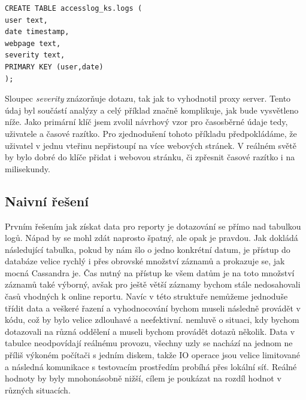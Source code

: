 \documentclass[thesis=M,czech]{FITthesis}[2012/06/26]
\begin{document}
\begin{lstlisting}[caption={Návrh tabulky pro ukládání všech logů},label=LogTable]
CREATE TABLE accesslog_ks.logs ( 
user text,
date timestamp,
webpage text,
severity text,
PRIMARY KEY (user,date) 
);
\end{lstlisting}

Sloupec \emph{severity} znázorňuje  dotazu, tak jak to vyhodnotil proxy server. Tento údaj byl součástí analýzy a celý příklad značně komplikuje, jak bude vysvětleno níže. Jako primární klíč jsem zvolil návrhový vzor pro časosběrné údaje tedy, uživatele a časové razítko. Pro zjednodušení tohoto příkladu předpokládáme, že uživatel v jednu vteřinu nepřistoupí na více webových stránek. V reálném světě by bylo dobré do klíče přidat i webovou stránku, či zpřesnit časové razítko i na milisekundy. 

\subsection{Naivní řešení}
Prvním řešením jak získat data pro reporty je dotazování se přímo nad tabulkou logů. Nápad by se mohl zdát naprosto špatný, ale opak je pravdou. Jak dokládá následující tabulka, pokud by nám šlo o jedno konkrétní datum, je přístup do databáze velice rychlý i přes obrovské množství záznamů a prokazuje se, jak mocná Cassandra je. Čas nutný na přístup ke všem datům je na toto množství záznamů také výborný, avšak pro ještě větší záznamy bychom stále nedosahovali časů vhodných k online reportu. Navíc v této struktuře nemůžeme jednoduše třídit data a veškeré řazení a vyhodnocování bychom museli následně provádět v kódu, což by bylo velice zdlouhavé a neefektivní. nemluvě o situaci, kdy bychom dotazovali na různá oddělení a museli bychom provádět dotazů několik. Data v tabulce neodpovídají reálnému provozu, všechny uzly se nachází na jednom ne příliš výkoném počítači s jedním diskem, takže IO operace jsou velice limitované a následná komunikace s testovacím prostředím probíhá přes lokální síť. Reálné hodnoty by byly mnohonásobně nižší, cílem je poukázat na rozdíl hodnot v různých situacích.   	
\end{document}
